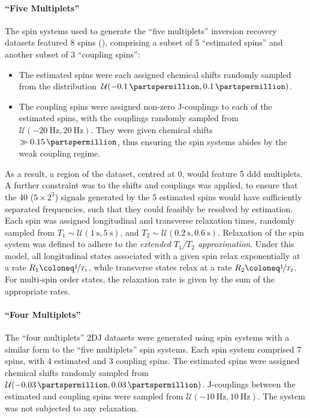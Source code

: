 \paragraph{``Five Multiplets''}
The spin systems used to generate the ``five multiplets'' inversion recovery
datasets featured 8 spins (), comprising a subset of 5 ``estimated
spins'' and another subset of 3 ``coupling spins'':
\begin{itemize}
    \item The estimated spins were each assigned chemical shifts randomly
        sampled from the distribution
        \,$\mathcal{U}(\qty{-0.1}{\partspermillion}, \qty{0.1}{\partspermillion})$.
    \item The coupling spins were assigned non-zero J-couplings to each of the
        estimated spins, with the couplings randomly sampled from
        \,$\mathcal{U}(\qty{-20}{\hertz}, \qty{20}{\hertz})$.
        They were given chemical shifts $\gg
        \qty{0.15}{\partspermillion}$, thus ensuring the spin systems abides by
        the weak coupling regime.
\end{itemize}
As a result, a region of the dataset, centred at \qty{0}{\partspermillion},
would feature 5 ddd multiplets.
A further constraint was to the shifts and couplings was applied, to ensure
that the 40 ($5 \times 2^3$) signals generated by the 5 estimated spins would
have sufficiently separated frequencies, such that they could feasibly be
resolved by estimation.  Each spin was assigned longitudinal and transverse
relaxation times, randomly sampled from $T_1 \sim \mathcal{U}(\qty{1}{\second},
\qty{5}{\second})$, and $T_2 \sim \mathcal{U}(\qty{0.2}{\second},
\qty{0.6}{\second})$.
Relaxation of the spin system was defined to adhere to the \emph{extended
$T_1$/$T_2$ approximation}\cite{SpinachRelax}. Under this model, all
longitudinal states associated with a given spin relax exponentially at a rate
$R_1 \coloneq \nicefrac{1}{T_1}$, while transverse states relax at a rate $R_2
\coloneq \nicefrac{1}{T_2}$. For multi-spin order states, the relaxation rate
is given by the sum of the appropriate rates.

\paragraph{``Four Multiplets''}
The ``four multiplets'' \ac{2DJ} datasets were generated using spin systems
with a similar form to the ``five multiplets'' spin systems. Each spin system
comprised 7 spins, with 4 estimated and 3 coupling spins. The estimated spins
were assigned chemical shifts randomly sampled from
$\mathcal{U}(-\qty{0.03}{\partspermillion}, \qty{0.03}{\partspermillion})$.
J-couplings between the estimated and coupling spins were sampled from
$\mathcal{U}(\qty{-10}{\hertz}, \qty{10}{\hertz})$. The system was not
subjected to any relaxation.

